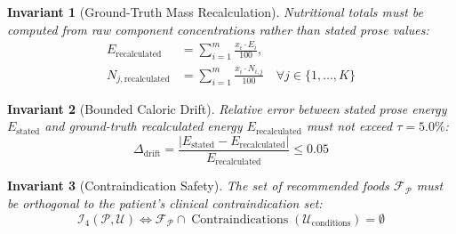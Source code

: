 \documentclass[5p,times,twocolumn]{elsarticle}
\newtheorem{invariant}{Invariant}
\begin{document}
\begin{invariant}[Ground-Truth Mass Recalculation]
Nutritional totals must be computed from raw component concentrations rather than stated prose values:
\begin{align}
E_{\text{recalculated}} &= \sum_{i=1}^m \frac{x_i \cdot E_i}{100}, \nonumber \\
N_{j,\text{recalculated}} &= \sum_{i=1}^m \frac{x_i \cdot N_{i,j}}{100} \quad \forall j \in \{1, \ldots, K\}
\end{align}
\end{invariant}

\begin{invariant}[Bounded Caloric Drift]
Relative error between stated prose energy $E_{\text{stated}}$ and ground-truth recalculated energy $E_{\text{recalculated}}$ must not exceed $\tau = 5.0\%$:
\begin{equation}
\Delta_{\text{drift}} = \frac{|E_{\text{stated}} - E_{\text{recalculated}}|}{E_{\text{recalculated}}} \le 0.05
\end{equation}
\end{invariant}

\begin{invariant}[Contraindication Safety]
The set of recommended foods $\mathcal{F}_{\mathcal{P}}$ must be orthogonal to the patient's clinical contraindication set:
\begin{equation}
\mathcal{I}_4(\mathcal{P}, \mathcal{U}) \iff \mathcal{F}_{\mathcal{P}} \cap \operatorname{Contraindications}(\mathcal{U}_{\text{conditions}}) = \emptyset
\end{equation}
\end{invariant}
\end{document}
